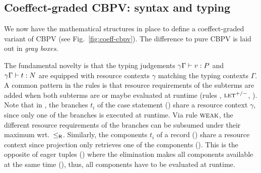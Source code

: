 \documentclass[acmsmall,review,anonymous]{acmart}\settopmatter{printfolios=true,printccs=false,printacmref=false}
\begin{document}
\subsection{Coeffect-graded CBPV: syntax and typing}

We now have the mathematical structures in place to define a
coeffect-graded variant of CBPV (see Fig.~\ref{fig:coeff-cbpv}).
The difference to pure CBPV is laid out in \emph{gray boxes}.

The fundamental novelty is that the typing judgements
$\gamma\Gamma \vdash v : P$ and $\gamma\Gamma \vdash t : N$ are
equipped with resource contexts $\gamma$ matching the typing contexts
$\Gamma$.  A common pattern in the rules is that resource requirements
of the subterms are added when both subterms are or maybe evaluated at
runtime (rules \rintro\otimes, $\mbox{\textsc{let}}^{+/-}$,
\relim{\Box/\GS/\otimes/\diamond/\lolli}).  Note that in \relim\GS,
the branches $t_i$ of the case statement (\relim\GS) share a resource
context $\gamma$, since only one of the branches is executed at
runtime.  Via rule $\mbox{\textsc{weak}}$,
the different resource requirements of the branches can be
subsumed under their maximum wrt.\ $\leq_{\mathsf{R}}$.  Similarly, the
components $t_i$ of a record (\rintro\Pi) share a resource context
since projection only retrieves one of the components (\relim\Pi).  This is
the opposite of eager tuples (\rintro\otimes) where the elimination
makes all components available at the same time (\relim\otimes), thus,
all components have to be evaluated at runtime.
\end{document}
